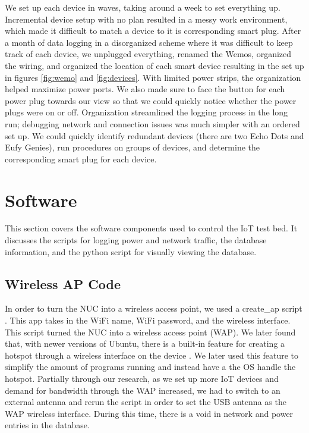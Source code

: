 We set up each device in waves, taking around a week to set everything up. Incremental device setup with no plan resulted in a messy work environment, which made it difficult to match a device to it is corresponding smart plug. After a month of data logging in a disorganized scheme where it was difficult to keep track of each device, we unplugged everything, renamed the Wemos, organized the wiring, and organized the location of each smart device resulting in the set up in figures \ref{fig:wemo} and \ref{fig:devices}. With limited power strips, the organization helped maximize power ports. We also made sure to face the button for each power plug towards our view so that we could quickly notice whether the power plugs were on or off. Organization streamlined the logging process in the long run; debugging network and connection issues was much simpler with an ordered set up. We could quickly identify redundant devices (there are two Echo Dots and Eufy Genies), run procedures on groups of devices, and determine the corresponding smart plug for each device.

\section{Software}
\label{software}
This section covers the software components used to control the IoT test bed. It discusses the scripts for logging power and network traffic, the database information, and the python script for visually viewing the database.

\subsection{Wireless AP Code}
In order to turn the NUC into a wireless access point, we used a create\_ap script \cite{oblique_2017}. This app takes in the WiFi name, WiFi password, and the wireless interface. This script turned the NUC into a wireless access point (WAP). We later found that, with newer versions of Ubuntu, there is a built-in feature for creating a hotspot through a wireless interface on the device \cite{m_2016}. We later used this feature to simplify the amount of programs running and instead have a the OS handle the hotspot. Partially through our research, as we set up more IoT devices and demand for bandwidth through the WAP increased, we had to switch to an external antenna and rerun the script in order to set the USB antenna as the WAP wireless interface. During this time, there is a void in network and power entries in the database.

